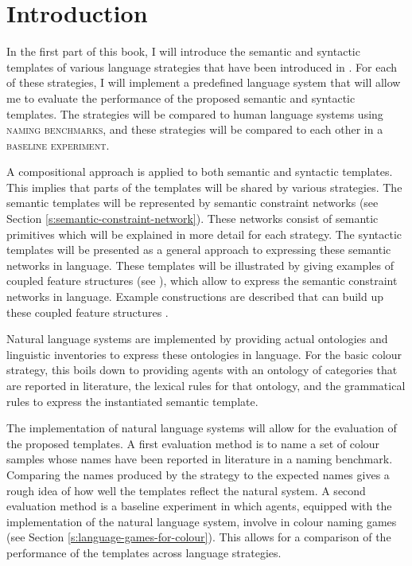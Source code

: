 \section*{Introduction}

In the first part of this book, I will introduce the semantic and
syntactic templates of various language strategies that have been
introduced in . For each of these
strategies, I will implement a predefined language system that will
allow me to evaluate the performance of the proposed semantic and
syntactic templates. The strategies will be compared to human language
systems using \textsc{naming benchmarks}, and these strategies will be
compared to each other in a \textsc{baseline experiment}.

A compositional approach is applied to both
semantic and syntactic
  templates. This implies that parts of the
templates will be shared by various strategies. The semantic templates
will be represented by semantic constraint networks (see Section
\ref{s:semantic-constraint-network}). These networks consist of
semantic primitives which will be explained in more detail for each
strategy. The syntactic templates will be presented as a general
approach to expressing these semantic networks in language. These
templates will be illustrated by giving examples of coupled feature
structures (see ), which
allow to express the semantic constraint networks in language. Example
constructions are described that can build up these coupled feature
structures \citep{bleys06next, steels07emergence, bleys08expressing}.

Natural language systems are implemented by providing actual
ontologies and linguistic inventories to express these ontologies in
language. For the basic colour strategy, this boils down to providing
agents with an ontology of categories that are reported in literature,
the lexical rules for that ontology, and the grammatical rules to
express the instantiated semantic template.

The implementation of natural language systems will allow for the
evaluation of the proposed templates. A first evaluation method is to
name a set of colour samples whose names have been reported in
literature in a naming benchmark. 
Comparing the names produced by the strategy to the
expected names gives a rough idea of how well the templates reflect
the natural system. A second evaluation method is a baseline
  experiment in which agents, equipped
with the implementation of the natural language system, involve in
colour naming games (see Section
\ref{s:language-games-for-colour}). This allows for a comparison of
the performance of the templates across language strategies.

\newpage
\thispagestyle{empty}
